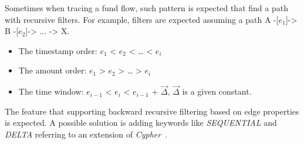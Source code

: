 
Sometimes when tracing a fund flow, such pattern is expected that find a path
with recursive filters. For example, filters are expected assuming a path A
-[${e_1}$]-> B -[${e_2}$]-> ... -> X.

\begin{itemize}
    \item The timestamp order: ${e_1}$ < ${e_2}$ < … < ${e_i}$
    \item The amount order: ${e_1}$ > ${e_2}$ > … > ${e_i}$
    \item The time window: ${e_{i-1}}$ < ${e_i}$ < ${e_{i-1}}$ + $\vec{\Delta}$,
    $\vec{\Delta}$ is a given constant.
\end{itemize}


The feature that supporting backward recursive filtering based on edge
properties is expected. A possible solution is adding keywords like
\emph{SEQUENTIAL} and \emph{DELTA} referring to an extension of
\emph{Cypher}~\cite{tcypher}.


